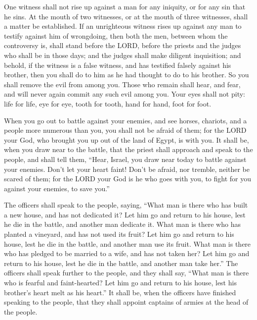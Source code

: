 \myverse{}One witness shall not rise up against a man for any iniquity,
or for any sin that he sins. At the mouth of two witnesses, or at the mouth of three witnesses, shall
a matter be established.
\myverse{}If an unrighteous witness rises up against any man to testify against him
of wrongdoing,
\myverse{}then both the men, between whom the controversy is, shall stand before the
LORD, before the priests and the judges who shall be in those days;
\myverse{}and the judges shall make diligent inquisition; and behold, if the witness
is a false witness, and has testified falsely against his brother,
\myverse{}then you shall do to him as he had thought to do to his brother. So you shall
remove the evil from among you.
\myverse{}Those who remain shall hear, and fear, and will never again commit any such
evil among you.
\myverse{}Your eyes shall not pity: life for life, eye for eye, tooth for tooth, hand
for hand, foot for foot.


\mychapter{} \myverse*{}When you go out to battle against your enemies, and see horses,
chariots, and a people more numerous than you, you shall not be afraid of them; for the LORD your God,
who brought you up out of the land of Egypt, is with you.
\myverse{}It shall be, when you draw near to the battle, that the priest shall approach
and speak to the people,
\myverse{}and shall tell them, “Hear, Israel, you draw near today to battle against your
enemies. Don’t let your heart faint! Don’t be afraid, nor tremble, neither be scared of them;
\myverse{}for the LORD your God is he who goes with you, to fight for you against your
enemies, to save you.”


\myverse{}The officers shall speak to the people, saying, “What man is there
who has built a new house, and has not dedicated it? Let him go and return to his house, lest he die in
the battle, and another man dedicate it.
\myverse{}What man is there who has planted a vineyard, and has not used its fruit? Let
him go and return to his house, lest he die in the battle, and another man use its fruit.
\myverse{}What man is there who has pledged to be married to a wife, and has not taken
her? Let him go and return to his house, lest he die in the battle, and another man take her.”
\myverse{}The officers shall speak further to the people, and they shall say, “What man
is there who is fearful and faint-hearted? Let him go and return to his house, lest his brother’s heart
melt as his heart.”
\myverse{}It shall be, when the officers have finished speaking to the people, that they
shall appoint captains of armies at the head of the people.


